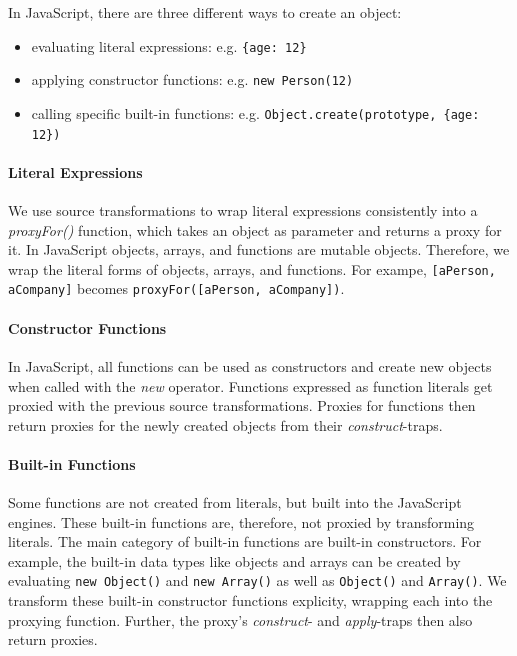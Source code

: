 In JavaScript, there are three different ways to create an object: 
\begin{itemize}
    \item evaluating literal expressions: e.g. \lstinline|{age: 12}|
    \item applying constructor functions: e.g. \lstinline|new Person(12)|
    \item calling specific built-in functions: e.g. \lstinline|Object.create(prototype, {age: 12})|
\end{itemize}

\paragraph{Literal Expressions}
We use source transformations to wrap literal expressions consistently into a \emph{proxyFor()} function, which takes an object as parameter and returns a proxy for it.
In JavaScript objects, arrays, and functions are mutable objects.
Therefore, we wrap the literal forms of objects, arrays, and functions.
For exampe, \lstinline{[aPerson, aCompany]} becomes \lstinline{proxyFor([aPerson, aCompany])}.

\paragraph{Constructor Functions} 
In JavaScript, all functions can be used as constructors and create new objects when called with the \emph{new} operator.
Functions expressed as function literals get proxied with the previous source transformations.
Proxies for functions then return proxies for the newly created objects from their \emph{construct}-traps.

\paragraph{Built-in Functions}
Some functions are not created from literals, but built into the JavaScript engines.
These built-in functions are, therefore, not proxied by transforming literals.
The main category of built-in functions are built-in constructors.
For example, the built-in data types like objects and arrays can be created by evaluating \lstinline{new Object()} and \lstinline{new Array()} as well as \lstinline{Object()} and \lstinline{Array()}.
We transform these built-in constructor functions explicity, wrapping each into the proxying function.
Further, the proxy's \emph{construct}- and \emph{apply}-traps then also return proxies.

